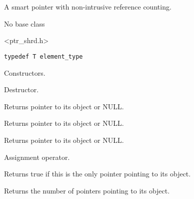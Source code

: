 \section{}\label{wxsharedptr}

A smart pointer with non-intrusive reference counting.


No base class


<ptr\_shrd.h>


{\small%
\begin{verbatim}
typedef T element_type
\end{verbatim}
}%



\label{wxsharedptrwxsharedptr}



Constructors.

\label{wxsharedptrdtor}


Destructor.

\label{wxsharedptrget}


Returns pointer to its object or NULL.

\label{wxsharedptroperatorptrt}


Returns pointer to its object or NULL.

\label{wxsharedptroperatorderef}


Returns pointer to its object or NULL.

\label{wxsharedptroperatorassign}


Assignment operator.

\label{wxsharedptrunique}


Returns true if this is the only pointer pointing to its object.

\label{wxsharedptruse\_count}


Returns the number of pointers pointing to its object.

